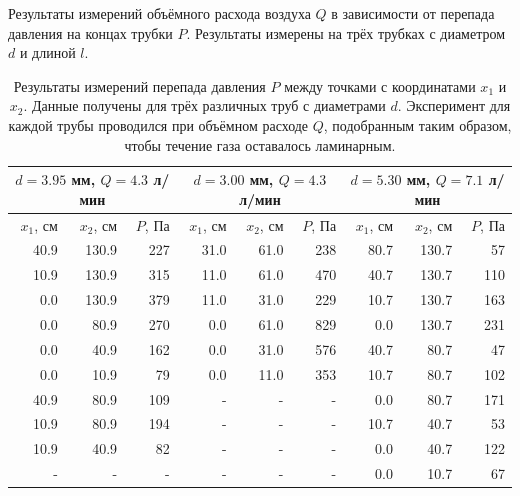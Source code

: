 \documentclass[12pt]{article}
\begin{document}
\begin{table}[H]
    \caption{Результаты измерений объёмного расхода воздуха $Q$ в зависимости от перепада давления на
        концах трубки $P$. Результаты измерены на трёх трубках с диаметром $d$ и длиной $l$.}
    \label{tab:1}
\end{table}
\begin{table}[H]
    \centering
    \begin{tabular}{|r|r|r|r|r|r|r|r|r|}
        \hline
        \multicolumn{3}{|c|}{$d = 3.95$ мм, $Q = 4.3$ л/мин} & 
        \multicolumn{3}{|c|}{$d = 3.00$ мм, $Q = 4.3$ л/мин} & 
        \multicolumn{3}{|c|}{$d = 5.30$ мм, $Q = 7.1$ л/мин}                                                                                           \\
        \hline
        $x_1$, см                           & $x_2$, см & $P$, Па & $x_1$, см & $x_2$, см & $P$, Па & $x_1$, см & $x_2$, см & $P$, Па \\ 
        \hline
        40.9                                & 130.9     & 227     & 31.0      & 61.0      & 238     & 80.7      & 130.7     & 57      \\ 
        10.9                                & 130.9     & 315     & 11.0      & 61.0      & 470     & 40.7      & 130.7     & 110     \\ 
        0.0                                 & 130.9     & 379     & 11.0      & 31.0      & 229     & 10.7      & 130.7     & 163     \\ 
        0.0                                 & 80.9      & 270     & 0.0       & 61.0      & 829     & 0.0       & 130.7     & 231     \\ 
        0.0                                 & 40.9      & 162     & 0.0       & 31.0      & 576     & 40.7      & 80.7      & 47      \\ 
        0.0                                 & 10.9      & 79      & 0.0       & 11.0      & 353     & 10.7      & 80.7      & 102     \\ 
        40.9                                & 80.9      & 109     & -         & -         & -       & 0.0       & 80.7      & 171     \\ 
        10.9                                & 80.9      & 194     & -         & -         & -       & 10.7      & 40.7      & 53      \\ 
        10.9                                & 40.9      & 82      & -         & -         & -       & 0.0       & 40.7      & 122     \\ 
        -                                   & -         & -       & -         & -         & -       & 0.0       & 10.7      & 67      \\ 
        \hline
    \end{tabular}
    
    \caption{Результаты измерений перепада давления $P$ между точками с координатами $x_1$ и $x_2$.
        Данные получены для трёх различных труб с диаметрами $d$. Эксперимент для каждой трубы проводился при 
        объёмном расходе $Q$, подобранным таким образом, чтобы течение газа оставалось ламинарным.}
    \label{tab:2}
\end{table}
\end{document}
